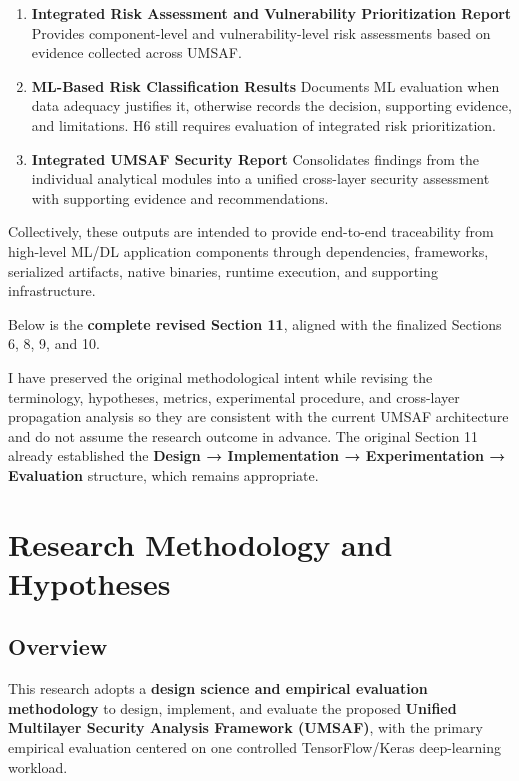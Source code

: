 \documentclass[
  12pt,
  letterpaper,
  oneside]{report}
\begin{document}
\begin{enumerate}
\item
  \textbf{Integrated Risk Assessment and Vulnerability Prioritization
  Report} Provides component-level and vulnerability-level risk
  assessments based on evidence collected across UMSAF.
\item
  \textbf{ML-Based Risk Classification Results} Documents ML evaluation
  when data adequacy justifies it, otherwise records the decision,
  supporting evidence, and limitations. H6 still requires evaluation of
  integrated risk prioritization.
\item
  \textbf{Integrated UMSAF Security Report} Consolidates findings from
  the individual analytical modules into a unified cross-layer security
  assessment with supporting evidence and recommendations.
\end{enumerate}

Collectively, these outputs are intended to provide end-to-end
traceability from high-level ML/DL application components through
dependencies, frameworks, serialized artifacts, native binaries, runtime
execution, and supporting infrastructure.

Below is the \textbf{complete revised Section 11}, aligned with the
finalized Sections 6, 8, 9, and 10.

I have preserved the original methodological intent while revising the
terminology, hypotheses, metrics, experimental procedure, and
cross-layer propagation analysis so they are consistent with the current
UMSAF architecture and do not assume the research outcome in advance.
The original Section 11 already established the \textbf{Design →
Implementation → Experimentation → Evaluation} structure, which remains
appropriate.

\chapter{Research Methodology and Hypotheses}\label{11-research-methodology-and-hypotheses}

\section{Overview}\label{111-overview}

This research adopts a \textbf{design science and empirical evaluation
methodology} to design, implement, and evaluate the proposed
\textbf{Unified Multilayer Security Analysis Framework (UMSAF)}, with
the primary empirical evaluation centered on one controlled
TensorFlow/Keras deep-learning workload.
\end{document}
